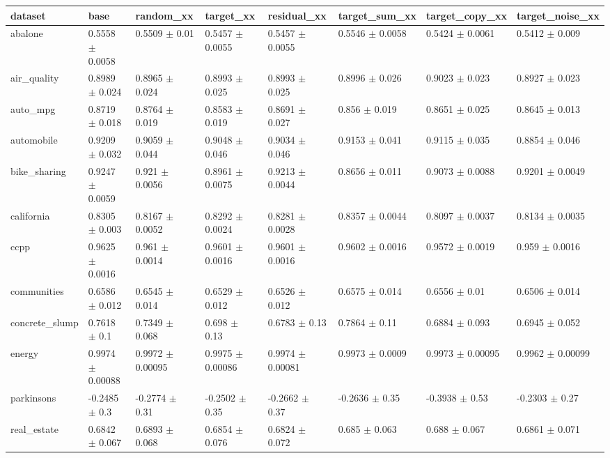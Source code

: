 \begin{tabular}{llllllll}
\toprule
dataset & base & random\_xx & target\_xx & residual\_xx & target\_sum\_xx & target\_copy\_xx & target\_noise\_xx \\
\midrule
abalone & 0.5558 $\pm$ 0.0058 & 0.5509 $\pm$ 0.01 & 0.5457 $\pm$ 0.0055 & 0.5457 $\pm$ 0.0055 & 0.5546 $\pm$ 0.0058 & 0.5424 $\pm$ 0.0061 & 0.5412 $\pm$ 0.009 \\
air\_quality & 0.8989 $\pm$ 0.024 & 0.8965 $\pm$ 0.024 & 0.8993 $\pm$ 0.025 & 0.8993 $\pm$ 0.025 & 0.8996 $\pm$ 0.026 & 0.9023 $\pm$ 0.023 & 0.8927 $\pm$ 0.023 \\
auto\_mpg & 0.8719 $\pm$ 0.018 & 0.8764 $\pm$ 0.019 & 0.8583 $\pm$ 0.019 & 0.8691 $\pm$ 0.027 & 0.856 $\pm$ 0.019 & 0.8651 $\pm$ 0.025 & 0.8645 $\pm$ 0.013 \\
automobile & 0.9209 $\pm$ 0.032 & 0.9059 $\pm$ 0.044 & 0.9048 $\pm$ 0.046 & 0.9034 $\pm$ 0.046 & 0.9153 $\pm$ 0.041 & 0.9115 $\pm$ 0.035 & 0.8854 $\pm$ 0.046 \\
bike\_sharing & 0.9247 $\pm$ 0.0059 & 0.921 $\pm$ 0.0056 & 0.8961 $\pm$ 0.0075 & 0.9213 $\pm$ 0.0044 & 0.8656 $\pm$ 0.011 & 0.9073 $\pm$ 0.0088 & 0.9201 $\pm$ 0.0049 \\
california & 0.8305 $\pm$ 0.003 & 0.8167 $\pm$ 0.0052 & 0.8292 $\pm$ 0.0024 & 0.8281 $\pm$ 0.0028 & 0.8357 $\pm$ 0.0044 & 0.8097 $\pm$ 0.0037 & 0.8134 $\pm$ 0.0035 \\
ccpp & 0.9625 $\pm$ 0.0016 & 0.961 $\pm$ 0.0014 & 0.9601 $\pm$ 0.0016 & 0.9601 $\pm$ 0.0016 & 0.9602 $\pm$ 0.0016 & 0.9572 $\pm$ 0.0019 & 0.959 $\pm$ 0.0016 \\
communities & 0.6586 $\pm$ 0.012 & 0.6545 $\pm$ 0.014 & 0.6529 $\pm$ 0.012 & 0.6526 $\pm$ 0.012 & 0.6575 $\pm$ 0.014 & 0.6556 $\pm$ 0.01 & 0.6506 $\pm$ 0.014 \\
concrete\_slump & 0.7618 $\pm$ 0.1 & 0.7349 $\pm$ 0.068 & 0.698 $\pm$ 0.13 & 0.6783 $\pm$ 0.13 & 0.7864 $\pm$ 0.11 & 0.6884 $\pm$ 0.093 & 0.6945 $\pm$ 0.052 \\
energy & 0.9974 $\pm$ 0.00088 & 0.9972 $\pm$ 0.00095 & 0.9975 $\pm$ 0.00086 & 0.9974 $\pm$ 0.00081 & 0.9973 $\pm$ 0.0009 & 0.9973 $\pm$ 0.00095 & 0.9962 $\pm$ 0.00099 \\
parkinsons & -0.2485 $\pm$ 0.3 & -0.2774 $\pm$ 0.31 & -0.2502 $\pm$ 0.35 & -0.2662 $\pm$ 0.37 & -0.2636 $\pm$ 0.35 & -0.3938 $\pm$ 0.53 & -0.2303 $\pm$ 0.27 \\
real\_estate & 0.6842 $\pm$ 0.067 & 0.6893 $\pm$ 0.068 & 0.6854 $\pm$ 0.076 & 0.6824 $\pm$ 0.072 & 0.685 $\pm$ 0.063 & 0.688 $\pm$ 0.067 & 0.6861 $\pm$ 0.071 \\

\end{tabular}
